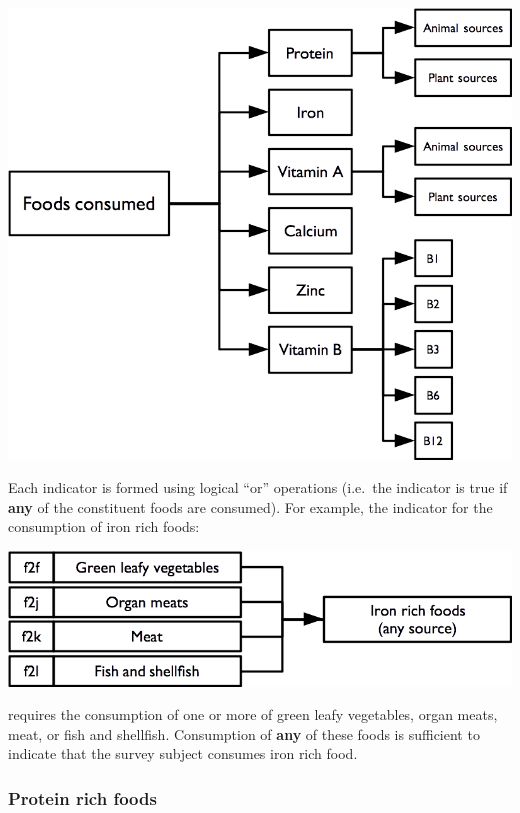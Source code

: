 \documentclass[12pt,a4paper]{book}
\theoremstyle{definition}
\theoremstyle{definition}
\theoremstyle{definition}
\theoremstyle{remark}
\begin{document}
\begin{center}\includegraphics{figures/indicators07} \end{center}

Each indicator is formed using logical ``or'' operations (i.e.~the
indicator is true if \textbf{any} of the constituent foods are
consumed). For example, the indicator for the consumption of iron rich
foods:

\begin{center}\includegraphics{figures/indicators08} \end{center}

requires the consumption of one or more of green leafy vegetables, organ
meats, meat, or fish and shellfish. Consumption of \textbf{any} of these
foods is sufficient to indicate that the survey subject consumes iron
rich food.

\hypertarget{protein-rich-foods}{%
\subsubsection{Protein rich foods}\label{protein-rich-foods}}
\end{document}
